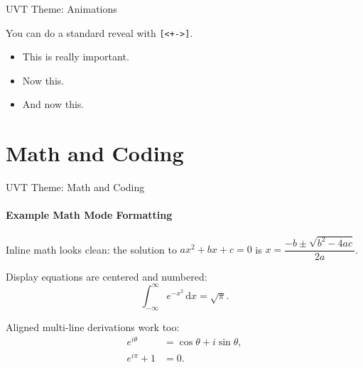 \documentclass[aspectratio=169, t]{beamer}
\begin{document}
\begin{frame}{UVT Theme: Animations}

You can do a standard reveal with \texttt{[<+->]}.
\bigskip

\begin{itemize}[<+->]
    \item This is\alert<4>{ really} important.
    \item Now this.
    \item And now this.
\end{itemize}

\end{frame}

\section{Math and Coding}

\begin{frame}{UVT Theme: Math and Coding}
\framesubtitle{Example Math Mode Formatting}

Inline math looks clean: the solution to $ax^2 + bx + c = 0$ is
$x = \dfrac{-b \pm \sqrt{b^2 - 4ac}}{2a}$.

\bigskip
Display equations are centered and numbered:
\begin{equation}
    \int_{-\infty}^\infty e^{-x^2}\, \mathrm{d}x = \sqrt{\pi}.
\end{equation}

\bigskip
Aligned multi-line derivations work too:
\begin{align*}
    e^{i\theta} & = \cos\theta + i\sin\theta, \\
    e^{i\pi} + 1 & = 0.
\end{align*}

\end{frame}
\end{document}

